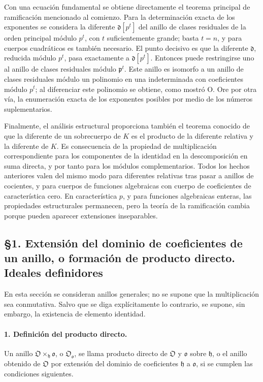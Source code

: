 Con una ecuación fundamental se obtiene directamente el teorema principal de ramificación mencionado al comienzo. Para la determinación exacta de los exponentes se considera la diferente $\mathfrak d[p^t]$ del anillo de clases residuales de la orden principal módulo $p^t$, con $t$ suficientemente grande; basta $t=n$, y para cuerpos cuadráticos es también necesario. El punto decisivo es que la diferente $\mathfrak d$, reducida módulo $p^t$, pasa exactamente a $\mathfrak d[p^t]$. Entonces puede restringirse uno al anillo de clases residuales módulo $\mathfrak p^t$. Este anillo es isomorfo a un anillo de clases residuales módulo un polinomio en una indeterminada con coeficientes módulo $p^t$; al diferenciar este polinomio se obtiene, como mostró O. Ore por otra vía, la enumeración exacta de los exponentes posibles por medio de los números suplementarios.

Finalmente, el análisis estructural proporciona también el teorema conocido de que la diferente de un sobrecuerpo de $K$ es el producto de la diferente relativa y la diferente de $K$. Es consecuencia de la propiedad de multiplicación correspondiente para los componentes de la identidad en la descomposición en suma directa, y por tanto para los módulos complementarios. Todos los hechos anteriores valen del mismo modo para diferentes relativas tras pasar a anillos de cocientes, y para cuerpos de funciones algebraicas con cuerpo de coeficientes de característica cero. En característica $p$, y para funciones algebraicas enteras, las propiedades estructurales permanecen, pero la teoría de la ramificación cambia porque pueden aparecer extensiones inseparables.

\subsection*{§1. Extensión del dominio de coeficientes de un anillo, o formación de producto directo. Ideales definidores}

En esta sección se consideran anillos generales; no se supone que la multiplicación sea conmutativa. Salvo que se diga explícitamente lo contrario, se supone, sin embargo, la existencia de elemento identidad.

\paragraph{1. Definición del producto directo.}
Un anillo $\mathfrak O\times_{\mathfrak h}\mathfrak o$, o $\mathfrak O_{\mathfrak o}$, se llama producto directo de $\mathfrak O$ y $\mathfrak o$ sobre $\mathfrak h$, o el anillo obtenido de $\mathfrak O$ por extensión del dominio de coeficientes $\mathfrak h$ a $\mathfrak o$, si se cumplen las condiciones siguientes.

